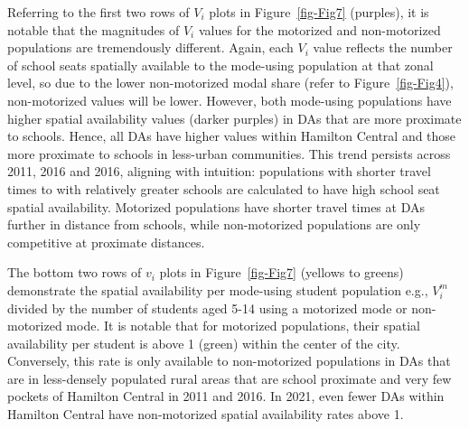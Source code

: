\documentclass[
default
]{sn-jnl}
\begin{document}
Referring to the first two rows of \(V_i\) plots in
Figure~\ref{fig-Fig7} (purples), it is notable that the magnitudes of
\(V_i\) values for the motorized and non-motorized populations are
tremendously different. Again, each \(V_i\) value reflects the number of
school seats spatially available to the mode-using population at that
zonal level, so due to the lower non-motorized modal share (refer to
Figure~\ref{fig-Fig4}), non-motorized values will be lower. However,
both mode-using populations have higher spatial availability values
(darker purples) in DAs that are more proximate to schools. Hence, all
DAs have higher values within Hamilton Central and those more proximate
to schools in less-urban communities. This trend persists across 2011,
2016 and 2016, aligning with intuition: populations with shorter travel
times to with relatively greater schools are calculated to have high
school seat spatial availability. Motorized populations have shorter
travel times at DAs further in distance from schools, while
non-motorized populations are only competitive at proximate distances.

The bottom two rows of \(v_i\) plots in Figure~\ref{fig-Fig7} (yellows
to greens) demonstrate the spatial availability per mode-using student
population e.g., \(V_i^m\) divided by the number of students aged 5-14
using a motorized mode or non-motorized mode. It is notable that for
motorized populations, their spatial availability per student is above 1
(green) within the center of the city. Conversely, this rate is only
available to non-motorized populations in DAs that are in less-densely
populated rural areas that are school proximate and very few pockets of
Hamilton Central in 2011 and 2016. In 2021, even fewer DAs within
Hamilton Central have non-motorized spatial availability rates above 1.
\end{document}
